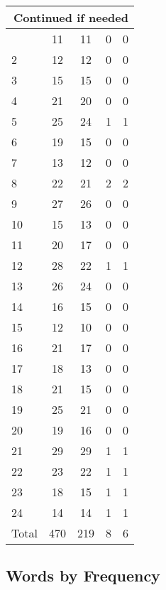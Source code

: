 \begin{center}
\begin{longtable}{l|c|c|c|c}
\hline \multicolumn{5}{|r|}{{Continued if needed}} \\ \hline
\endfoot 
1 & 11 & 11 & 0 & 0\\ \hline
2 & 12 & 12 & 0 & 0\\ \hline
3 & 15 & 15 & 0 & 0\\ \hline
4 & 21 & 20 & 0 & 0\\ \hline
5 & 25 & 24 & 1 & 1\\ \hline
6 & 19 & 15 & 0 & 0\\ \hline
7 & 13 & 12 & 0 & 0\\ \hline
8 & 22 & 21 & 2 & 2\\ \hline
9 & 27 & 26 & 0 & 0\\ \hline
10 & 15 & 13 & 0 & 0\\ \hline
11 & 20 & 17 & 0 & 0\\ \hline
12 & 28 & 22 & 1 & 1\\ \hline
13 & 26 & 24 & 0 & 0\\ \hline
14 & 16 & 15 & 0 & 0\\ \hline
15 & 12 & 10 & 0 & 0\\ \hline
16 & 21 & 17 & 0 & 0\\ \hline
17 & 18 & 13 & 0 & 0\\ \hline
18 & 21 & 15 & 0 & 0\\ \hline
19 & 25 & 21 & 0 & 0\\ \hline
20 & 19 & 16 & 0 & 0\\ \hline
21 & 29 & 29 & 1 & 1\\ \hline
22 & 23 & 22 & 1 & 1\\ \hline
23 & 18 & 15 & 1 & 1\\ \hline
24 & 14 & 14 & 1 & 1\\ \hline
\hline \hline
Total & 470 & 219 & 8 & 6




\end{longtable}
\end{center}



\subsection{Words by Frequency}

